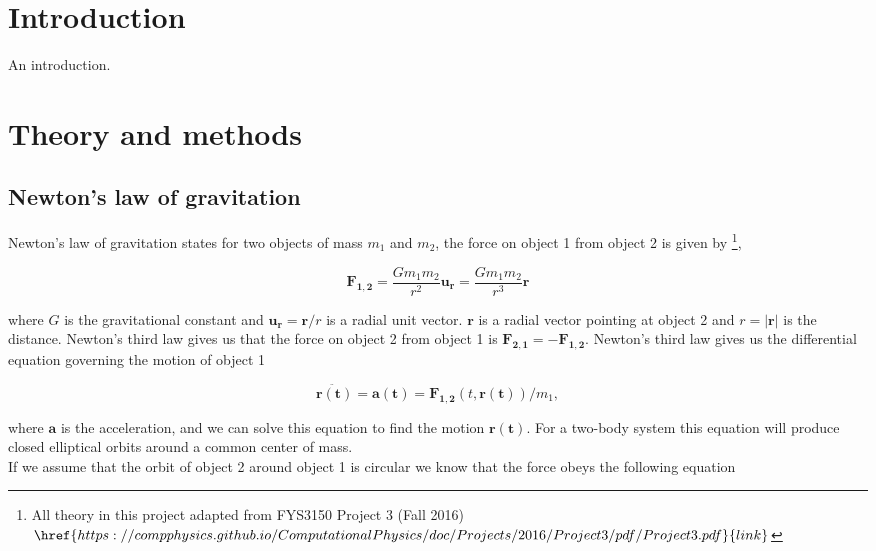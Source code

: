 \documentclass[%
 reprint,
 nobalance,
 amsmath,amssymb,
 aps,
]{revtex4-1}
\begin{document}

\maketitle

\section{\label{sec:Int}Introduction}
An introduction.


\section{\label{sec:The}Theory and methods}

\subsection{\label{sec:New}Newton's law of gravitation}
Newton's law of gravitation states for two objects of mass $m_1$ and $m_2$, the force on object 1 from object 2 is given by \footnote{All theory in this project adapted from FYS3150 Project 3 (Fall 2016) $\href{https://compphysics.github.io/ComputationalPhysics/doc/Projects/2016/Project3/pdf/Project3.pdf}{link}$},

\begin{equation}
	\bm{F_{1,2}} = \frac{Gm_1 m_2}{r^2} \bm{u_r} = \frac{Gm_1 m_2}{r^3} \bm{r}
\end{equation}

where $G$ is the gravitational constant and $\bm{u_r} = \bm{r}/r$ is a radial unit vector. $\bm{r}$ is a radial vector pointing at object 2 and $r = \left|\bm{r}\right| $ is the distance. Newton's third law gives us that the force on object 2 from object 1 is $\bm{F_{2,1}} = - \bm{F_{1,2}}$. Newton's third law gives us the differential equation governing the motion of object 1

\begin{equation}
	\bm{\ddot{r(t)}} = \bm{a(t)} = \bm{F_{1,2}}(t, \bm{r(t)})/m_1,
\end{equation}

where $\bm{a}$ is the acceleration, and we can solve this equation to find the motion $\bm{r(t)}$. For a two-body system this equation will produce closed elliptical orbits around a common center of mass.\\
If we assume that the orbit of object 2 around object 1 is circular we know that the force obeys the following equation
\end{document}
